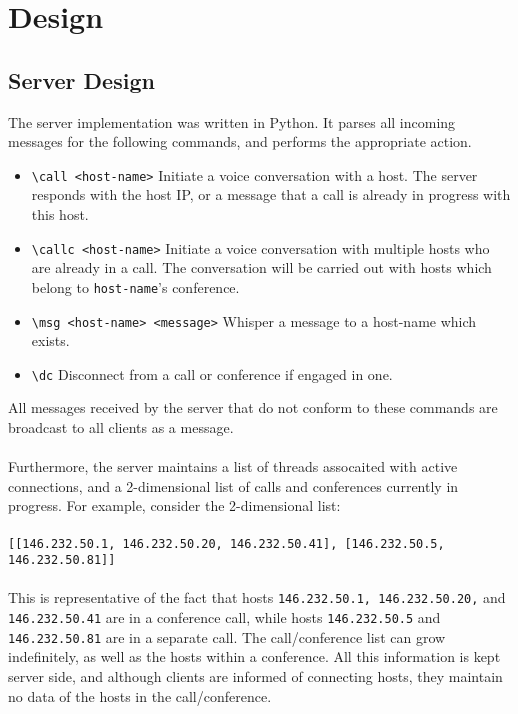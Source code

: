 \documentclass[10pt,a4paper]{article}
\begin{document}
\section{Design}
\label{det}
\subsection{Server Design}
The server implementation was written in Python. It parses all incoming messages for the following commands,
and performs the appropriate action.

\begin{itemize}
 \item \verb|\call <host-name>| Initiate a voice conversation with a host. The server responds with the host IP, or a message that a call is already in progress with this host.
 \item \verb|\callc <host-name>| Initiate a voice conversation with multiple hosts who are already in a call. The conversation will be carried out with hosts which belong to \verb|host-name|'s conference.
 \item \verb|\msg <host-name> <message>| Whisper a message to a host-name which exists.
 \item \verb|\dc| Disconnect from a call or conference if engaged in one.
\end{itemize}

All messages received by the server that do not conform to these commands are broadcast to all clients as a message.
\paragraph{}
Furthermore, the server maintains a list of threads assocaited with active connections,
and a 2-dimensional list of calls and conferences currently in progress. For example, consider the 2-dimensional list:
\paragraph{}
\verb|[[146.232.50.1, 146.232.50.20, 146.232.50.41], [146.232.50.5, 146.232.50.81]]|
\paragraph{}
This is representative of the fact that hosts \verb|146.232.50.1, 146.232.50.20,| and \verb|146.232.50.41| are in a conference call,
while hosts \verb|146.232.50.5| and \verb|146.232.50.81| are in a separate call.
The call/conference list can grow indefinitely,
as well as the hosts within a conference. All this information is kept server side, and although clients are informed of
connecting hosts, they maintain no data of the hosts in the call/conference.
\end{document}
